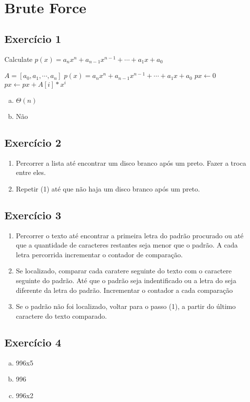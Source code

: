 \section{Brute Force}\label{sec:brute_force}

\subsection{Exercício 1}\label{sec:exer1}

\begin{algorithm}
  \caption{Calculate $p(x) = a_{n}x{^n}+a_{n-1}x^{n-1}+\cdots+a_{1}x+a_{0}$}
  \begin{algorithmic}
    \REQUIRE $A=[a_{0}, a_{1}, \cdots, a_{n}]$
    \ENSURE $p(x) = a_{n}x{^n}+a_{n-1}x^{n-1}+\cdots+a_{1}x+a_{0}$
    \STATE $px \leftarrow 0$
      \STATE $px \leftarrow px + A[i]*x^{i}$
    \ENDFOR
  \end{algorithmic}
\end{algorithm}

\begin{enumerate}[a)]
  \item $\Theta(n)$
  \item Não
\end{enumerate}


\subsection{Exercício 2}\label{sec:exer2}

\begin{enumerate}
  \item Percorrer a lista até encontrar um disco branco após um preto. Fazer a
  troca entre eles.
  \item Repetir (1) até que não haja um disco branco após um preto.
\end{enumerate}


\subsection{Exercício 3}\label{sec:exer3}

\begin{enumerate}
  \item Percorrer o texto até encontrar a primeira letra do padrão procurado ou
  até que a quantidade de caracteres restantes seja menor que o padrão.
  A cada letra percorrida incrementar o contador de comparação.
  \item Se localizado, comparar cada caratere seguinte do texto com o caractere
  seguinte do padrão. Até que o padrão seja indentificado ou a letra do seja diferente
  da letra do padrão. Incrementar o contador a cada comparação
  \item Se o padrão não foi localizado, voltar para o passo (1), a partir do último
  caractere do texto comparado.
\end{enumerate}


\subsection{Exercício 4}\label{sec:exer4}

\begin{enumerate}[a)]
  \item 996x5
  \item 996
  \item 996x2
\end{enumerate}

